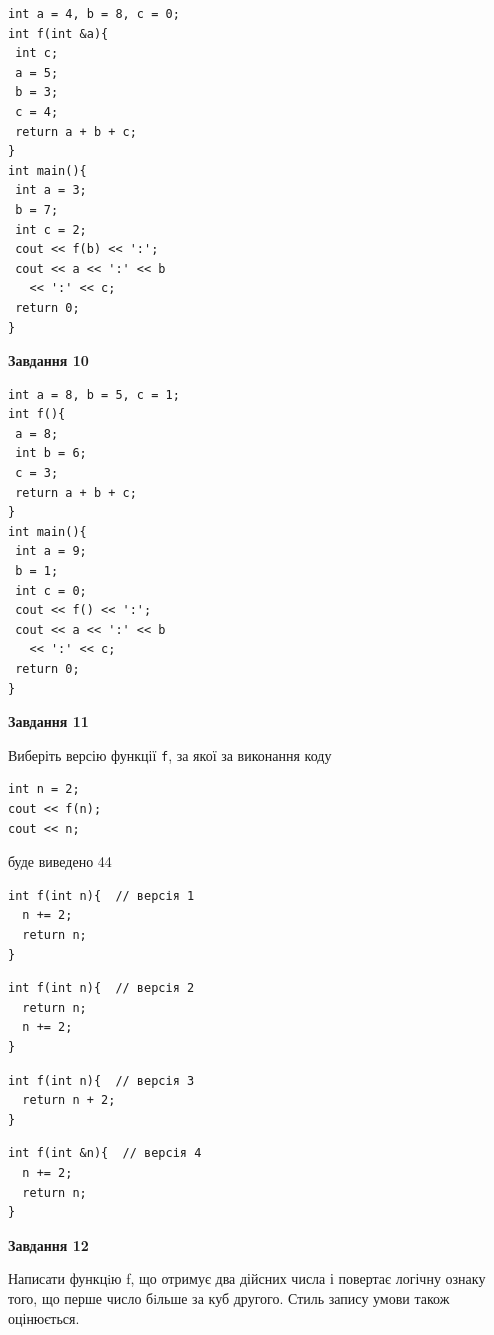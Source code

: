 \documentclass[12pt, ukrainian]{article}
\def\code#1{\Verb!#1!}
\begin{document}
{\begin {large}
\begin{minipage}[t]{7.0cm}
\begin{verbatim}
int a = 4, b = 8, c = 0;
int f(int &a){
 int c;
 a = 5;
 b = 3;
 c = 4;
 return a + b + c;
}
int main(){
 int a = 3;
 b = 7;
 int c = 2;
 cout << f(b) << ':';
 cout << a << ':' << b 
   << ':' << c;
 return 0;
}
\end{verbatim}



\begin{center}
\textbf{Завдання 10}
\end{center}
\vspace{-8mm}

\begin{verbatim}
int a = 8, b = 5, c = 1;
int f(){
 a = 8;
 int b = 6;
 c = 3;
 return a + b + c;
}
int main(){
 int a = 9;
 b = 1;
 int c = 0;
 cout << f() << ':';
 cout << a << ':' << b 
   << ':' << c;
 return 0;
}
\end{verbatim}

\end{minipage}
\vline \hspace{1mm}
\begin{minipage}[t]{11.0cm}

\begin{center}
\textbf{Завдання 11}
\end{center}
Виберіть версію функції \code{f}, за якої за виконання коду
\begin{verbatim}
int n = 2;
cout << f(n);
cout << n;
\end{verbatim}

буде виведено 44

\begin{verbatim}
int f(int n){  // версія 1
  n += 2;
  return n;
}
\end{verbatim}

\vspace{-8mm}\begin{verbatim}
int f(int n){  // версія 2
  return n;
  n += 2;
}
\end{verbatim}

\vspace{-8mm}\begin{verbatim}
int f(int n){  // версія 3
  return n + 2;
}
\end{verbatim}

\vspace{-8mm}\begin{verbatim}
int f(int &n){  // версія 4
  n += 2;
  return n;
}
\end{verbatim}



\begin{center}
\textbf{Завдання 12}
\end{center}

Написати функцiю f, що отримує два дійсних числа і повертає логічну ознаку того, що перше число бiльше за куб другого. Стиль запису умови також оцінюється.\par

\end{minipage}

\end {large}}
\newpage
\end{document}
